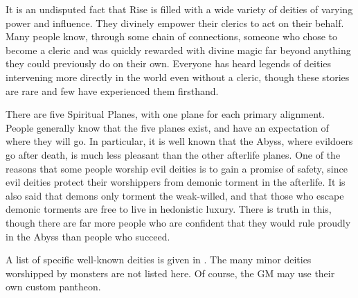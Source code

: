   It is an undisputed fact that Rise is filled with a wide variety of deities of varying power and influence.
  They divinely empower their clerics to act on their behalf.
  Many people know, through some chain of connections, someone who chose to become a cleric and was quickly rewarded with divine magic far beyond anything they could previously do on their own.
  Everyone has heard legends of deities intervening more directly in the world even without a cleric, though these stories are rare and few have experienced them firsthand.

  There are five Spiritual Planes, with one plane for each primary alignment.
  People generally know that the five planes exist, and have an expectation of where they will go.
  In particular, it is well known that the Abyss, where evildoers go after death, is much less pleasant than the other afterlife planes.
  One of the reasons that some people worship evil deities is to gain a promise of safety, since evil deities protect their worshippers from demonic torment in the afterlife.
  It is also said that demons only torment the weak-willed, and that those who escape demonic torments are free to live in hedonistic luxury.
  There is truth in this, though there are far more people who are confident that they would rule proudly in the Abyss than people who succeed.

  A list of specific well-known deities is given in .
  The many minor deities worshipped by monsters are not listed here.
  Of course, the GM may use their own custom pantheon.


